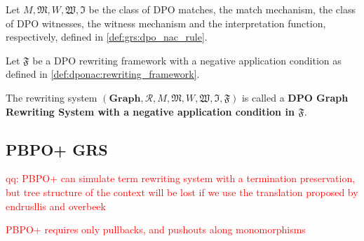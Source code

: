 
    \begin{definition}
      Let $M, \mathfrak{M}, W, \mathfrak{W}, \mathfrak{I}$ be the class of DPO matches, the match mechanism, the class of DPO witnesses, the witness mechanism and the interpretation function, respectively, defined in \autoref{def:grs:dpo_nac_rule}.

      Let $\mathfrak{F}$ be a DPO rewriting framework with a negative application condition as defined in \autoref{def:dponac:rewriting_framework}.

      The rewriting system $(\mathbf{Graph}, \mathcal{R}, M, \mathfrak{M}, W, \mathfrak{W}, \mathfrak{I}, \mathfrak{F})$ is called a \textbf{DPO Graph Rewriting System with a negative application condition in $\mathfrak{F}$}.
    \end{definition}
    
    \subsection{PBPO+ GRS}
    \textcolor{red}{qq: PBPO+ can simulate term rewriting system with a termination preservation, but tree structure of the context will be lost if we use the translation proposed by endrusllis and overbeek}
    
    \textcolor{red}{PBPO+ requires only pullbacks, and pushouts along monomorphisms}

